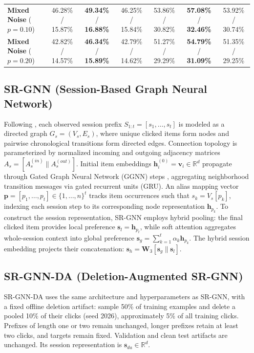 \documentclass[11pt]{article}
\begin{document}
\begin{table}[t]
{\begin{tabular}{lcccccc}
    \textbf{Mixed Noise} ($p=0.10$) & 46.28\% / 15.87\% & \textbf{49.34\%} / \textbf{16.88\%} & 46.25\% / 15.84\% & 53.86\% / 30.82\% & \textbf{57.08\%} / \textbf{32.46\%} & 53.92\% / 30.74\% \\
    \textbf{Mixed Noise} ($p=0.20$) & 42.82\% / 14.57\% & \textbf{46.34\%} / \textbf{15.89\%} & 42.79\% / 14.62\% & 51.27\% / 29.29\% & \textbf{54.79\%} / \textbf{31.09\%} & 51.35\% / 29.25\% \\
    \bottomrule
  \end{tabular}
  }
\end{table}

\subsection{SR-GNN (Session-Based Graph Neural Network)}
Following \citet{wu2019session}, each observed session prefix $S_{1:t} = [s_1, \dots, s_t]$ is modeled as a directed graph $G_s = (V_s, E_s)$, where unique clicked items form nodes and pairwise chronological transitions form directed edges. Connection topology is parameterized by normalized incoming and outgoing adjacency matrices $A_s = [A_s^{(in)} \parallel A_s^{(out)}]$. Initial item embeddings $\mathbf{h}_i^{(0)} = \mathbf{v}_i \in \mathbb{R}^d$ propagate through Gated Graph Neural Network (GGNN) steps \citep{li2015gated}, aggregating neighborhood transition messages via gated recurrent units (GRU). An alias mapping vector $\mathbf{p} = [p_1, \dots, p_t] \in \{1, \dots, n\}^t$ tracks item occurrences such that $s_k = V_s[p_k]$, indexing each session step to its corresponding node representation $\mathbf{h}_{p_k}$. To construct the session representation, SR-GNN employs hybrid pooling: the final clicked item provides local preference $\mathbf{s}_l = \mathbf{h}_{p_t}$, while soft attention aggregates whole-session context into global preference $\mathbf{s}_g = \sum_{k=1}^t \alpha_k \mathbf{h}_{p_k}$. The hybrid session embedding projects their concatenation: $\mathbf{s}_h = \mathbf{W}_3 [\mathbf{s}_g \parallel \mathbf{s}_l]$.

\subsection{SR-GNN-DA (Deletion-Augmented SR-GNN)}
SR-GNN-DA uses the same architecture and hyperparameters as SR-GNN, with a fixed offline deletion artifact: sample 50\% of training examples and delete a pooled 10\% of their clicks (seed 2026), approximately 5\% of all training clicks. Prefixes of length one or two remain unchanged, longer prefixes retain at least two clicks, and targets remain fixed. Validation and clean test artifacts are unchanged. Its session representation is $\mathbf{s}_{da}\in\mathbb{R}^d$.
\end{document}

